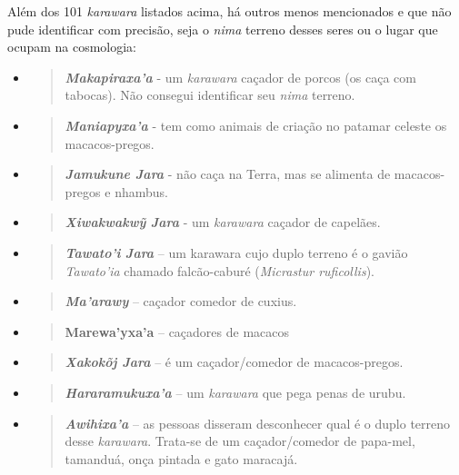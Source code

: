 Além dos 101 \emph{karawara} listados acima, há outros menos mencionados
e que não pude identificar com precisão, seja o \emph{nima} terreno
desses seres ou o lugar que ocupam na cosmologia:

\begin{itemize}
\item
  \begin{quote}
  \emph{\textbf{Makapiraxa'a}} - um \emph{karawara} caçador de porcos
  (os caça com tabocas). Não consegui identificar seu \emph{nima}
  terreno.
  \end{quote}
\item
  \begin{quote}
  \emph{\textbf{Maniapyxa'a}} - tem como animais de criação no patamar
  celeste os macacos-pregos.
  \end{quote}
\item
  \begin{quote}
  \emph{\textbf{Jamukune Jara}} - não caça na Terra, mas se alimenta de
  macacos-pregos e nhambus.
  \end{quote}
\item
  \begin{quote}
  \textbf{\emph{Xiwakwakwỹ} \emph{Jara}} - um \emph{karawara} caçador de
  capelães.
  \end{quote}
\item
  \begin{quote}
  \textbf{\emph{Tawato'i} \emph{Jara}} -- um karawara cujo duplo terreno
  é o gavião \emph{Tawato'ia} chamado falcão-caburé (\emph{Micrastur
  ruficollis}).
  \end{quote}
\item
  \begin{quote}
  \emph{\textbf{Ma'arawy}} -- caçador comedor de cuxius.
  \end{quote}
\item
  \begin{quote}
  \textbf{Marewa'yxa'a} -- caçadores de macacos 
  \end{quote}
\item
  \begin{quote}
  \textbf{\emph{Xakokõj Jara}} -- é um caçador/comedor de
  macacos-pregos.
  \end{quote}
\item
  \begin{quote}
  \emph{\textbf{Hararamukuxa'a}} -- um \emph{karawara} que pega penas de
  urubu.
  \end{quote}
\item
  \begin{quote}
  \emph{\textbf{Awihixa'a}} -- as pessoas disseram desconhecer qual é o
  duplo terreno desse \emph{karawara}. Trata-se de um caçador/comedor de
  papa-mel, tamanduá, onça pintada e gato maracajá.
  \end{quote}
\end{itemize}

